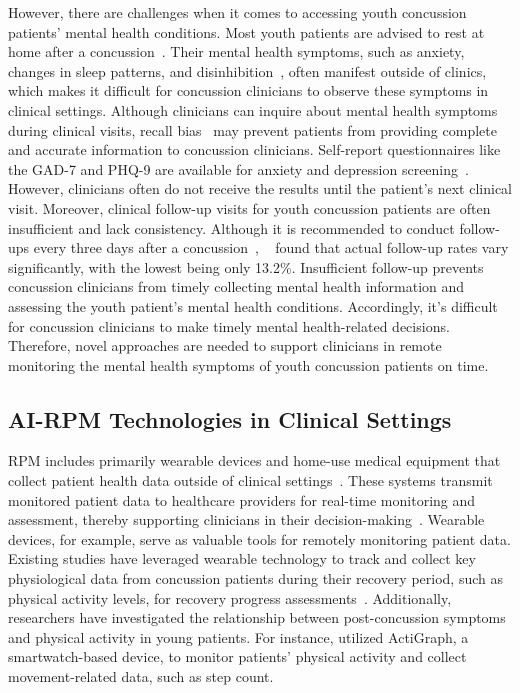 However, there are challenges when it comes to accessing youth concussion patients' mental health conditions. %
Most youth patients are advised to rest at home after a concussion~\cite{silverberg2023management}. 
Their mental health symptoms, such as anxiety, changes in sleep patterns, and disinhibition~\cite{brent2017psychiatric}, often manifest outside of clinics, which makes it difficult for concussion clinicians to observe these symptoms in clinical settings. 
Although clinicians can inquire about mental health symptoms during clinical visits, recall bias~\cite{frissa2016challenges,van2016accuracy} may prevent patients from providing complete and accurate information to concussion clinicians. 
Self-report questionnaires like the GAD-7 and PHQ-9 are available for anxiety and depression screening~\cite{brent2017psychiatric}.
However, clinicians often do not receive the results until the patient's next clinical visit.
Moreover, clinical follow-up visits for youth concussion patients are often insufficient and lack consistency. 
Although it is recommended to conduct follow-ups every three days after a concussion~\cite{healthmil_concussion_2024}, ~\citet{ramsay2023follow} found that actual follow-up rates vary significantly, with the lowest being only 13.2\%. 
Insufficient follow-up prevents concussion clinicians from timely collecting mental health information and assessing the youth patient’s mental health conditions. 
Accordingly, it's difficult for concussion clinicians to make timely mental health-related decisions. 
Therefore, novel approaches are needed to support clinicians in remote monitoring the mental health symptoms of youth concussion patients on time.




\subsection{AI-RPM Technologies in Clinical Settings} 
\label{sec:airpm}

 RPM includes primarily wearable devices and home-use medical equipment that collect patient health data outside of clinical settings~\cite{mendel2024advice}. These systems transmit monitored patient data to healthcare providers for real-time monitoring and assessment, thereby supporting clinicians in their decision-making~\cite{catalyst2018telehealth, baig2017systematic, us2008national}. Wearable devices, for example, serve as valuable tools for remotely monitoring patient data. Existing studies have leveraged wearable technology to track and collect key physiological data from concussion patients during their recovery period, such as physical activity levels, for recovery progress assessments~\cite{tirosh2024smartphone}. Additionally, researchers have investigated the relationship between post-concussion symptoms and physical activity in young patients. 
 For instance, \citet{yang2020bidirectional} utilized ActiGraph, a smartwatch-based device, to monitor patients’ physical activity and collect movement-related data, such as step count. 
 
